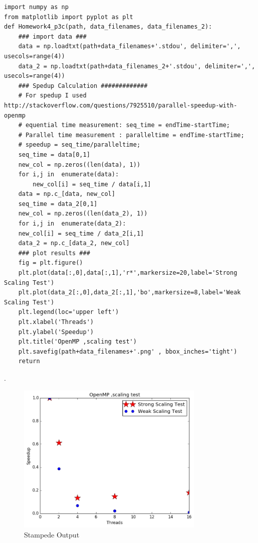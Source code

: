 \documentclass{article}
\begin{document}
\begin{program}
	\begin{verbatim}
import numpy as np
from matplotlib import pyplot as plt
def Homework4_p3c(path, data_filenames, data_filenames_2):
    ### import data ###
    data = np.loadtxt(path+data_filenames+'.stdou', delimiter=',', usecols=range(4))
    data_2 = np.loadtxt(path+data_filenames_2+'.stdou', delimiter=',', usecols=range(4))
    ### Spedup Calculation #############
    # For spedup I used  http://stackoverflow.com/questions/7925510/parallel-speedup-with-openmp
    # equential time measurement: seq_time = endTime-startTime;
    # Parallel time measurement : paralleltime = endTime-startTime; 
    # speedup = seq_time/paralleltime;
    seq_time = data[0,1] 
    new_col = np.zeros((len(data), 1))
    for i,j in  enumerate(data):
	    new_col[i] = seq_time / data[i,1]
    data = np.c_[data, new_col]
    seq_time = data_2[0,1] 
    new_col = np.zeros((len(data_2), 1))
    for i,j in  enumerate(data_2):
    new_col[i] = seq_time / data_2[i,1]
    data_2 = np.c_[data_2, new_col]
    ### plot results ###
    fig = plt.figure()
    plt.plot(data[:,0],data[:,1],'r*',markersize=20,label='Strong Scaling Test')
    plt.plot(data_2[:,0],data_2[:,1],'bo',markersize=8,label='Weak Scaling Test')
    plt.legend(loc='upper left')
    plt.xlabel('Threads')
    plt.ylabel('Speedup')
    plt.title('OpenMP ,scaling test')
    plt.savefig(path+data_filenames+'.png' , bbox_inches='tight')
    return
	\end{verbatim}
	\caption{The Python program used to generate Fig.\ \ref{fig:hw4_p3c_7822316}.}
	\label{fig:python1}
\end{program}

\newpage
.

\begin{figure}[htb]
	\begin{center}
		\includegraphics[width=0.8\textwidth]{hw4_p3c_7822316.png}
	\end{center}
	\caption{Stampede Output}
	\label{fig:hw4_p3c_7822316}
\end{figure}
\end{document}
